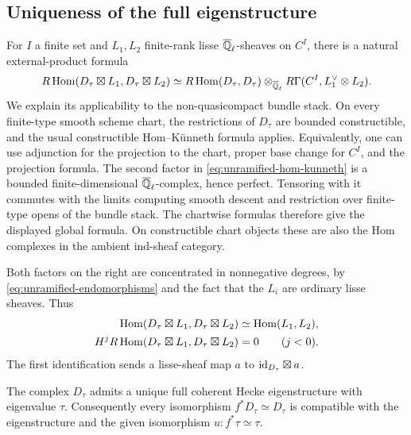 \subsection{Uniqueness of the full eigenstructure}

For $I$ a finite set and $L_1,L_2$ finite-rank lisse $\overline{\mathbb Q}_{\ell}$-sheaves on
$C^I$, there is a natural external-product formula
\begin{equation}\label{eq:unramified-hom-kunneth}
 R\operatorname{Hom}(D_\tau\boxtimes L_1,D_\tau\boxtimes L_2)
 \simeq
 R\operatorname{Hom}(D_\tau,D_\tau)\otimes_{\overline{\mathbb Q}_{\ell}}
       R\Gamma(C^I,L_1^\vee\otimes L_2).
\end{equation}
We explain its applicability to the non-quasicompact bundle stack.
On every finite-type smooth scheme chart, the restrictions of $D_\tau$
are bounded constructible, and the usual constructible Hom--K\"unneth
formula applies.  Equivalently, one can use adjunction for the projection
to the chart, proper base change for $C^I$, and the projection formula.
The second factor in \eqref{eq:unramified-hom-kunneth} is a bounded
finite-dimensional $\overline{\mathbb Q}_{\ell}$-complex, hence perfect.  Tensoring with it
commutes with the limits computing smooth descent and restriction over
finite-type opens of the bundle stack.  The chartwise formulas therefore
give the displayed global formula.  On constructible chart objects these
are also the Hom complexes in the ambient ind-sheaf category.

Both factors on the right are concentrated in nonnegative degrees, by
\eqref{eq:unramified-endomorphisms} and the fact that the $L_i$ are
ordinary lisse sheaves.  Thus
\begin{align}
 \operatorname{Hom}(D_\tau\boxtimes L_1,D_\tau\boxtimes L_2)
       &\simeq\operatorname{Hom}(L_1,L_2),\label{eq:unramified-hom-zero}\\
 H^jR\operatorname{Hom}(D_\tau\boxtimes L_1,D_\tau\boxtimes L_2)
       &=0\qquad(j<0).\label{eq:unramified-hom-negative}
\end{align}
The first identification sends a lisse-sheaf map $a$ to
$\mathrm{id}_{D_\tau}\boxtimes a$.

\begin{lemma}\label{lem:unramified-eigenstructure-unique}
The complex $D_\tau$ admits a unique full coherent Hecke eigenstructure
with eigenvalue $\tau$.  Consequently every isomorphism
$f^*D_\tau\simeq D_\tau$ is compatible with the eigenstructure and the
given isomorphism $u:f^*\tau\simeq\tau$.
\end{lemma}

